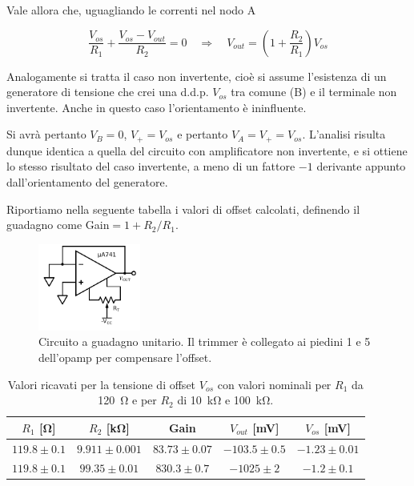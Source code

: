 Vale allora che, uguagliando le correnti nel nodo A

$$\frac{V_{os}}{R_1} + \frac{V_{os}-V_{out}}{R_2} = 0 \quad \Rightarrow \quad V_{out}=\left(1+\frac{R_2}{R_1}\right) V_{os}$$

Analogamente si tratta il caso non invertente, cioè si assume l'esistenza di un generatore di tensione che crei una d.d.p. $V_{os}$ tra comune (B) e il terminale non invertente.
Anche in questo caso l'orientamento è ininfluente.

Si avrà pertanto $V_B=0$, $V_+=V_{os}$ e pertanto $V_A=V_+=V_{os}$.
L'analisi risulta dunque identica a quella del circuito con amplificatore non invertente, e si ottiene lo stesso risultato del caso invertente, a meno di un fattore $-1$ derivante appunto dall'orientamento del generatore.

Riportiamo nella seguente tabella i valori di offset calcolati, definendo il guadagno come Gain$=1+R_2/R_1$.

\begin{figure}
  \caption{Circuito a guadagno unitario. Il trimmer è collegato ai piedini 1 e 5 dell'opamp per compensare l'offset.}
  \begin{center}
  \includegraphics[width=0.30\textwidth]{../E02/latex/trimmer_correction.pdf}
  \end{center}
  \label{cir2:trimmer}
\end{figure}

\begin{table}[h]
\begin{center}
\begin{savenotes}
\begin{minipage}[c]{0.7\textwidth}
    {\renewcommand{\arraystretch}{1.2}%
	\begin{tabular}{c|c|c|c|c}
		$R_1$ [\si{\ohm}] & $R_2$ [\si{\kilo\ohm}] & Gain &$V_{out}$ [\si{\milli\volt}] & $V_{os}$ [\si{\milli\volt}]\\ 
		\hline 
		$119.8\pm0.1$ & $9.911\pm0.001$ & $83.73\pm0.07$&  $-103.5 \pm 0.5$ & $-1.23 \pm0.01$\\
		\hline
		$119.8\pm0.1$ & $99.35\pm0.01$ & $830.3\pm0.7$ &$ -1025 \pm 2$ & $-1.2 \pm0.1$\\
	\end{tabular}
    }
  \end{minipage}\hfill
  \begin{minipage}[c]{0.3\textwidth}
	\caption{Valori ricavati per la tensione di offset $V_{os}$ con valori nominali per $R_1$ da \SI{120}{\ohm} e per $R_2$ di \SI{10}{\kilo\ohm} e \SI{100}{\kilo\ohm}.}
	\label{tab2:vos}
  \end{minipage}
\end{savenotes}
\end{center}
\end{table}

